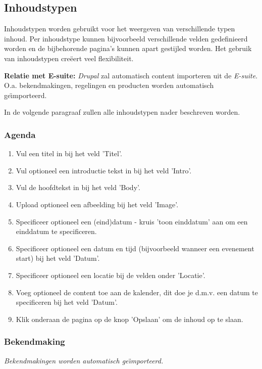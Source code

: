 \subsection{Inhoudstypen}\label{inhoudstypen}
Inhoudstypen worden gebruikt voor het weergeven van verschillende typen inhoud. Per inhoudstype kunnen bijvoorbeeld verschillende velden gedefinieerd worden en de bijbehorende pagina's kunnen apart gestijled worden. Het gebruik van inhoudstypen cre{\"{e}}ert veel flexibiliteit.

\textbf{Relatie met E-suite:}  \emph{Drupal} zal automatisch content importeren uit de \emph{E-suite}. O.a. bekendmakingen, regelingen en producten worden automatisch ge{\"\i}mporteerd. 

In de volgende paragraaf zullen alle inhoudstypen nader beschreven worden.

\subsubsection{Agenda}\label{agenda}

\begin{enumerate}
\item Vul een titel in bij het veld 'Titel'.
\item Vul optioneel een introductie tekst in bij het veld 'Intro'.
\item Vul de hoofdtekst in bij het veld 'Body'.
\item Upload optioneel een afbeelding bij het veld 'Image'.
\item Specificeer optioneel een (eind)datum - kruis 'toon einddatum' aan om een einddatum te specificeren.
\item Specificeer optioneel een datum en tijd (bijvoorbeeld wanneer een evenement start) bij het veld 'Datum'.
\item Specificeer optioneel een locatie bij de velden onder 'Locatie'.
\item Voeg optioneel de content toe aan de kalender, dit doe je d.m.v. een datum te specificeren bij het veld 'Datum'.
\item Klik onderaan de pagina op de knop 'Opslaan' om de inhoud op te slaan.
\end{enumerate}

\subsubsection{Bekendmaking}\label{bekendmaking}

\emph{Bekendmakingen worden automatisch ge{\"\i}mporteerd.}

